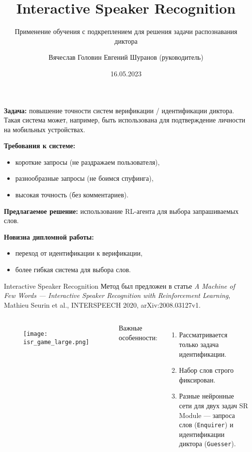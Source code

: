 \documentclass[aspectratio=169]{beamer}
\title{Interactive Speaker Recognition}
\subtitle{Применение обучения с подкреплением для решения задачи распознавания
          диктора}
\author[В.С.~Головин]{Вячеслав Головин \texorpdfstring{\newline}{, }
    {\small Евгений Шуранов (руководитель)}}
\institute[ВШЭ]{Huawei CBG AI и ФКН ВШЭ СПб}
\date{16.05.2023}
\newcommand{\guesser}{\texttt{Guesser}}
\newcommand{\enquirer}{\texttt{Enquirer}}
\begin{document}
\frame{\titlepage}

\begin{frame}{}
    \textbf{Задача:} повышение точности систем верификации / идентификации
    диктора. Такая система может, например, быть использована для подтверждение
    личности на мобильных устройствах.\vspace{1em}

    \textbf{Требования к системе:}
    \begin{itemize}
        \item короткие запросы (не раздражаем пользователя),
        \item разнообразные запросы (не боимся спуфинга),
        \item высокая точность (без комментариев).
    \end{itemize}\vspace{1em}

    \textbf{Предлагаемое решение:} использование RL-агента для выбора
    запрашиваемых слов.\vspace{1em}

    \textbf{Новизна дипломной работы:}
    \begin{itemize}
        \item переход от идентификации к верификации,
        \item более гибкая система для выбора слов.
    \end{itemize}
\end{frame}

\begin{frame}{Interactive Speaker Recognition}
    Метод был предложен в статье \textit{A Machine of Few Words --- Interactive
    Speaker Recognition with Reinforcement Learning}, Mathieu Seurin et al.,
    INTERSPEECH 2020, arXiv:2008.03127v1.\vspace{1em}

    \begin{columns}
    
    \begin{figure}[bht]
        \texttt{[image: isr\_game\_large.png]}
    \end{figure}

    Важные особенности:
    \begin{enumerate}
        \item Рассматривается только задача идентификации.
        \item Набор слов строго фиксирован.
        \item Разные нейронные сети для двух задач SR Module --- запроса слов
        (\enquirer) и идентификации диктора (\guesser).
    \end{enumerate}
    \end{columns}
\end{frame}
\end{document}
